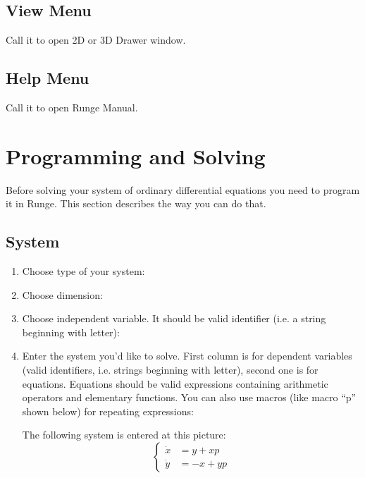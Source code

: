 \documentclass[12pt]{article}
\begin{document}
\subsection{View Menu}



Call it to open 2D or 3D Drawer window.

\subsection{Help Menu}

Call it to open Runge Manual.






\section{Programming and Solving}

Before solving your system of ordinary differential equations you need to program it in Runge.
This section describes the way you can do that.

\subsection{System}

\begin{enumerate}

\item Choose type of your system:


\item Choose dimension:


\item Choose independent variable. It should be valid identifier (i.e. a string beginning with letter):


\item Enter the system you'd like to solve. First column is for dependent variables 
(valid identifiers, i.e. strings beginning with letter), second one is for equations.
Equations should be valid expressions\EndLink{}
containing arithmetic operators and elementary functions.
You can also use macros (like macro ``p'' shown below) for repeating expressions:


The following system is entered at this picture:
\[
 \left\{
  \begin{aligned}
\dot x&=y+xp\\
\dot y&=-x+yp
  \end{aligned}
 \right.
\]


\end{enumerate}
\end{document}

